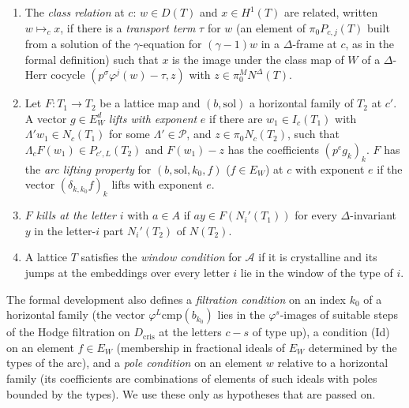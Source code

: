 \begin{definition}
\begin{enumerate}[label=(\alph*)]
\item The \emph{class relation} at $c$: $w\in D(T)$ and $x\in H^1(T)$ are related, written $w\mapsto_cx$, if there is
  a \emph{transport term} $\tau$ for $w$ (an element of $\pi_0P_{c,j}(T)$ built from a solution of the $\gamma$-equation for
  $(\gamma-1)w$ in a $\Delta$-frame at $c$, as in the formal definition) such that $x$ is the image under the class map of
  $W$ of a $\Delta$-Herr cocycle $(p^\sigma\varphi^j(w)-\tau,z)$ with $z\in\pi_0^MN^\Delta(T)$.
\item Let $F\colon T_1\to T_2$ be a lattice map and $(b,\mathrm{sol})$ a horizontal family of $T_2$ at $c'$. A vector
  $g\in E_W^d$ \emph{lifts with exponent} $e$ if there are $w_1\in I_c(T_1)$ with $\Lambda'w_1\in N_c(T_1)$ for some
  $\Lambda'\in\mathcal P$, and $z\in\pi_0N_c(T_2)$, such that $\Lambda_cF(w_1)\in P_{c',L}(T_2)$ and $F(w_1)-z$ has the
  coefficients $(p^eg_k)_k$. $F$ has the \emph{arc lifting property} for $(b,\mathrm{sol},k_0,f)$ ($f\in E_W$) at $c$ with
  exponent $e$ if the vector $(\delta_{k,k_0}f)_k$ lifts with exponent $e$.
\item $F$ \emph{kills at the letter} $i$ with $a\in A$ if $ay\in F(N_i'(T_1))$ for every $\Delta$-invariant $y$ in the
  letter-$i$ part $N_i'(T_2)$ of $N(T_2)$.
\item A lattice $T$ satisfies the \emph{window condition} for $\mathcal A$ if it is crystalline and its jumps at the
  embeddings over every letter $i$ lie in the window of the type of $i$.
\end{enumerate}
The formal development also defines a \emph{filtration condition} on an index $k_0$ of a horizontal family (the
vector $\varphi^L\mathrm{cmp}(b_{k_0})$ lies in the $\varphi^s$-images of suitable steps of the Hodge filtration on
$D_{\mathrm{cris}}$ at the letters $c-s$ of type up), a condition (Id) on an element $f\in E_W$ (membership in fractional
ideals of $E_W$ determined by the types of the arc), and a \emph{pole condition} on an element $w$ relative to a
horizontal family (its coefficients are combinations of elements of such ideals with poles bounded by the types). We use
these only as hypotheses that are passed on.
\end{definition}


